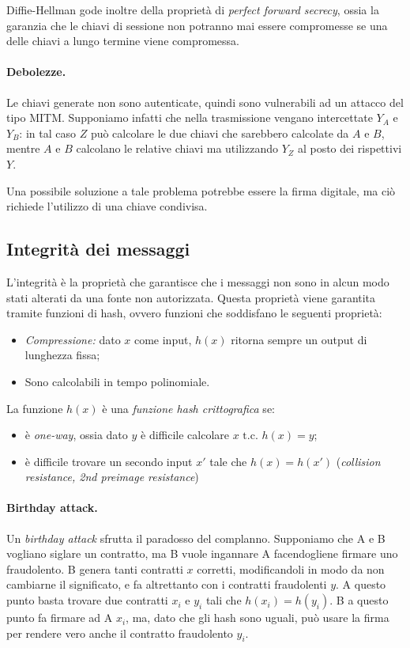 \documentclass[a4paper, 10pt, twoside]{article}
\begin{document}
	Diffie-Hellman gode inoltre della proprietà di \textit{perfect forward secrecy}, ossia la garanzia che le chiavi di sessione non potranno mai essere compromesse se una delle chiavi a lungo termine viene compromessa.
	
	\paragraph{Debolezze.} Le chiavi generate non sono autenticate, quindi sono vulnerabili ad un attacco del tipo MITM.
	Supponiamo infatti che nella trasmissione vengano intercettate $Y_A$ e $Y_B$: in tal caso $Z$ può calcolare le due chiavi che sarebbero calcolate da $A$ e $B$, mentre $A$ e $B$ calcolano le relative chiavi ma utilizzando $Y_Z$ al posto dei rispettivi $Y$.
	
	Una possibile soluzione a tale problema potrebbe essere la firma digitale, ma ciò richiede l'utilizzo di una chiave condivisa.
	
	\subsection{Integrità dei messaggi}
	L'integrità è la proprietà che garantisce che i messaggi non sono in alcun modo stati alterati da una fonte non autorizzata. Questa proprietà viene garantita tramite funzioni di hash, ovvero funzioni che soddisfano le seguenti proprietà: \begin{itemize}
		\item \textit{Compressione:} dato $x$ come input, $h(x) $ ritorna sempre un output di lunghezza fissa;
		\item Sono calcolabili in tempo polinomiale.
	\end{itemize}
	
	La funzione $h(x)$ è una \textit{funzione hash crittografica} se:\begin{itemize}
		\item è \textit{one-way}, ossia dato $y$ è difficile calcolare $x \text{ t.c. } h(x) = y$;
		\item è difficile trovare un secondo input $x'$ tale che $h(x) = h(x')$ (\textit{collision resistance, 2nd preimage resistance})
	\end{itemize}
	
	\paragraph{Birthday attack.} Un \textit{birthday attack} sfrutta il paradosso del complanno. Supponiamo che A e B vogliano siglare un contratto, ma B vuole ingannare A facendogliene firmare uno fraudolento. B genera tanti contratti $x$ corretti, modificandoli in modo da non cambiarne il significato, e fa altrettanto con i contratti fraudolenti $y$. A questo punto basta trovare due contratti $x_i$ e $y_i$ tali che $h(x_i) = h(y_i)$. B a questo punto fa firmare ad A $x_i$, ma, dato che gli hash sono uguali, può usare la firma per rendere vero anche il contratto fraudolento $y_i$.
	
\end{document}
